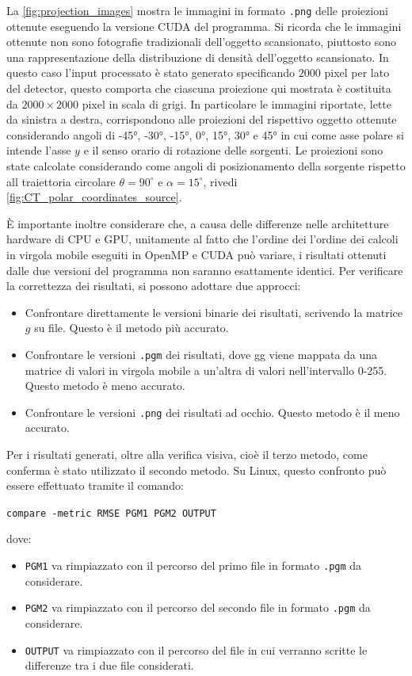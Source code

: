 \documentclass[12pt,a4paper]{report}
\begin{document}
La \autoref{fig:projection_images} mostra le immagini in formato \lstinline{.png} delle proiezioni ottenute eseguendo la versione
CUDA del programma.
Si ricorda che le immagini ottenute non sono fotografie tradizionali dell'oggetto scansionato, piuttosto sono una rappresentazione
della distribuzione di densità dell'oggetto scansionato.
In questo caso l'input processato è stato generato specificando \(2000\) pixel per lato del detector, questo comporta che
ciascuna proiezione qui mostrata è costituita da \(2000 \times 2000\) pixel in scala di grigi.
In particolare le immagini riportate, lette da sinistra a destra, corrispondono alle proiezioni del rispettivo oggetto ottenute
considerando angoli di -45°, -30°, -15°, 0°, 15°, 30° e 45° in cui come asse polare si intende l'asse \(y\) e il senso orario di
rotazione delle sorgenti.
Le proiezioni sono state calcolate considerando come angoli di posizionamento della sorgente rispetto all traiettoria circolare
\(\theta = 90^\circ\) e \(\alpha = 15^\circ\), rivedi \autoref{fig:CT_polar_coordinates_source}.

È importante inoltre considerare che, a causa delle differenze nelle architetture hardware di CPU e GPU, unitamente al fatto che
l'ordine dei l'ordine dei calcoli in virgola mobile eseguiti in OpenMP e CUDA può variare, i risultati ottenuti dalle due versioni
del programma non saranno esattamente identici.
Per verificare la correttezza dei risultati, si possono adottare due approcci:
\begin{itemize}
  \item Confrontare direttamente le versioni binarie dei risultati, scrivendo la matrice \(g\) su file.
        Questo è il metodo più accurato.
  \item Confrontare le versioni \lstinline{.pgm} dei risultati, dove gg viene mappata da una matrice di valori in virgola mobile a
        un'altra di valori nell'intervallo 0-255.
        Questo metodo è meno accurato.
  \item Confrontare le versioni \lstinline{.png} dei risultati ad occhio.
        Questo metodo è il meno accurato.
\end{itemize}
Per i risultati generati, oltre alla verifica visiva, cioè il terzo metodo, come conferma è stato utilizzato il secondo metodo.
Su Linux, questo confronto può essere effettuato tramite il comando:

\lstinline{compare -metric RMSE PGM1 PGM2 OUTPUT}

dove:
\begin{itemize}
  \item \lstinline{PGM1} va rimpiazzato con il percorso del primo file in formato \lstinline{.pgm} da considerare.
  \item \lstinline{PGM2} va rimpiazzato con il percorso del secondo file in formato \lstinline{.pgm} da considerare.
  \item \lstinline{OUTPUT} va rimpiazzato con il percorso del file in cui verranno scritte le differenze tra i due file
        considerati.
\end{itemize}
\end{document}
